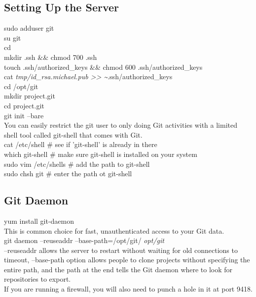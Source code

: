 \documentclass[11pt]{article}
\begin{document}
\subsection{Setting Up the Server}
\label{sec:org4400fa1}
sudo adduser git\\
su git\\
cd\\
mkdir .ssh \&\& chmod 700 .ssh\\
touch .ssh/authorized\_keys \&\& chmod 600 .ssh/authorized\_keys\\
cat \emph{tmp/id\_rsa.michael.pub >> \textasciitilde{}}.ssh/authorized\_keys\\
cd /opt/git\\
mkdir project.git\\
cd project.git\\
git init --bare\\

You can easily restrict the git user to only doing Git activities with a limited shell tool called git-shell that comes with Git.\\

cat /etc/shell \# see if 'git-shell' is already in there\\
which git-shell \# make sure git-shell is installed on your system\\
sudo vim /etc/shells \# add the path to git-shell\\

sudo chsh git \# enter the path ot git-shell\\

\subsection{Git Daemon}
\label{sec:org7e5e275}
yum install git-daemon\\

This is common choice for fast, unauthenticated access to your Git data.\\

git daemon --reuseaddr --base-path=/opt/git/ \emph{opt/git}\\

--reuseaddr allows the server to restart without waiting for old connections to timeout, --base-path option allows people to clone projects without specifying the entire path, and the path at the end tells the Git daemon where to look for repositories to export.\\

If you are running a firewall, you will also need to punch a hole in it at port 9418.\\
\end{document}

